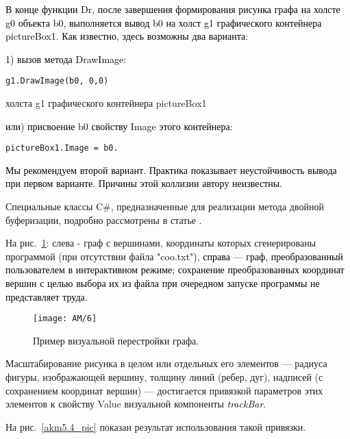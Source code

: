 \textcolor{black}{В конце функции Dr, после завершения формирования рисунка графа на холсте g0 объекта b0, выполняется
	вывод b0 на холст g1 графического контейнера pictureBox1. Как известно, здесь возможны два варианта:}

\noindent\textcolor{black}{1) вызов метода DrawImage: }

\begin{verbatim}
g1.DrawImage(b0, 0,0)
\end{verbatim}
холста g1 графического контейнера pictureBox1


\textcolor{black}{или) присвоение b0 свойству Image этого контейнера:}

\begin{verbatim}
pictureBox1.Image = b0.
\end{verbatim}

\textcolor{black}{Мы рекомендуем второй вариант. Практика показывает неустойчивость вывода при первом варианте. Причины
	этой коллизии автору неизвестны.}

\begin{remark}
Специальные классы C\#, предназначенные для реализации метода двойной буферизации, подробно
	рассмотрены в статье \cite{AKM_ch5_bib3}.
\end{remark}

\noindent На рис.~\ref{akm5.3_pic}: слева - граф с вершинами, координаты которых сгенерированы программой (при отсутствии файла \foreignlanguage{english}{\textcolor{black}{"coo.txt"}}\textcolor{black}{),
	справа --- граф, преобразованный пользователем в интерактивном режиме; сохранение преобразованных координат вершин с
	целью выбора их из файла при очередном запуске программы не представляет труда.}

\begin{figure}[H]\label{akm5.3_pic}
	\centering
	\texttt{[image: AM/6]}
	\caption{Пример визуальной перестройки графа.}
\end{figure}

\begin{remark}
Масштабирование рисунка в целом или отдельных его элементов --- радиуса фигуры, изображающей
	вершину, толщину линий (ребер, дуг), надписей (с сохранением координат вершин) --- достигается привязкой параметров этих
	элементов к свойству  Value визуальной
	компоненты \foreignlanguage{english}{\textit{\textcolor{black}{trackBar}}}.
\end{remark}
\noindent На рис.~\ref{akm5.4_pic} показан 	результат использования такой привязки.


